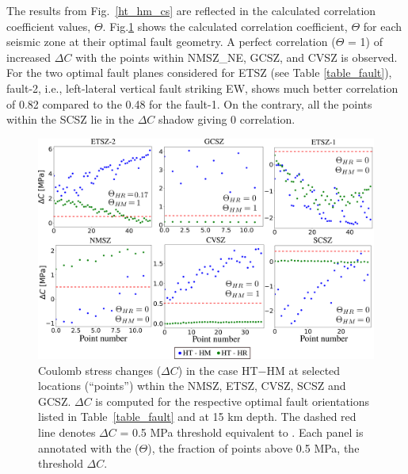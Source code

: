 \documentclass[draft,linenumbers]{agujournal2018}
\begin{document}
The results from Fig.~\ref{ht_hm_cs} are reflected in the calculated correlation coefficient values, $\Theta$. Fig.\ref{ht_hm_corr} shows the calculated correlation coefficient, $\Theta$ for each seismic zone at their optimal fault geometry. A perfect correlation ($\Theta$ = 1) of increased $\Delta C$ with the points within NMSZ\_NE, GCSZ, and CVSZ is observed. For the two optimal fault planes considered for ETSZ (see Table  \ref{table_fault}), fault-2, i.e., left-lateral vertical fault striking EW, shows much better correlation of 0.82 compared to the 0.48 for the fault-1. On the contrary, all the points within the SCSZ lie in the $\Delta C$ shadow giving 0 correlation.
%
\begin{figure}[h!]
    \centering
    \includegraphics[width=0.75\linewidth]{figures/corr_cs.png}
    \caption{ Coulomb stress changes ($\Delta C$) in the case HT$-$HM at selected locations (``points'')  wthin the NMSZ, ETSZ, CVSZ, SCSZ and GCSZ. $\Delta C$ is computed for the respective optimal fault orientations listed in Table~\ref{table_fault} and at 15 km depth. The dashed red line denotes $\Delta C$ = 0.5 MPa threshold equivalent to . Each panel is annotated with the ($\Theta$), the fraction of points above 0.5 MPa, the threshold $\Delta C$.}
    \label{ht_hm_corr}
\end{figure}
\end{document}

